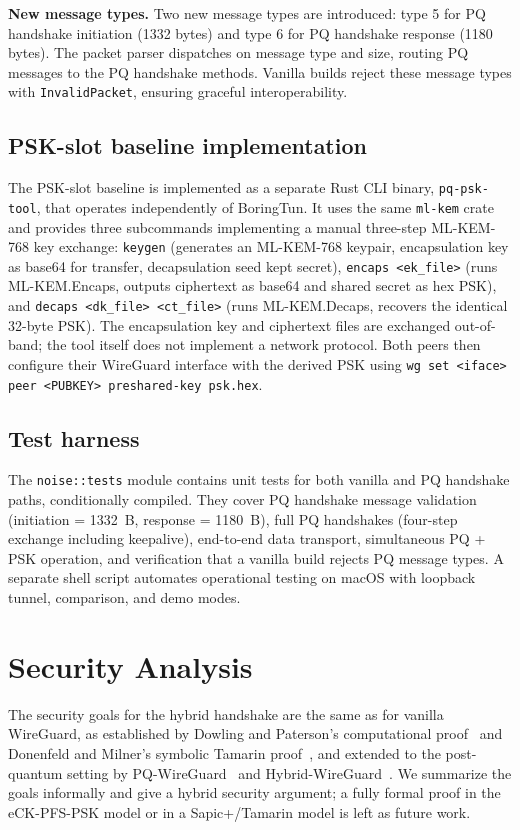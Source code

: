 \documentclass[11pt,a4paper]{article}
\begin{document}
\textbf{New message types.} Two new message types are introduced: type 5 for PQ handshake initiation (1332 bytes) and type 6 for PQ handshake response (1180 bytes). The packet parser dispatches on message type and size, routing PQ messages to the PQ handshake methods. Vanilla builds reject these message types with \texttt{InvalidPacket}, ensuring graceful interoperability.

\subsection{PSK-slot baseline implementation}

The PSK-slot baseline is implemented as a separate Rust CLI binary, \texttt{pq-psk-tool}, that operates independently of BoringTun. It uses the same \texttt{ml-kem} crate and provides three subcommands implementing a manual three-step ML-KEM-768 key exchange: \texttt{keygen} (generates an ML-KEM-768 keypair, encapsulation key as base64 for transfer, decapsulation seed kept secret), \texttt{encaps <ek\_file>} (runs ML-KEM.Encaps, outputs ciphertext as base64 and shared secret as hex PSK), and \texttt{decaps <dk\_file> <ct\_file>} (runs ML-KEM.Decaps, recovers the identical 32-byte PSK). The encapsulation key and ciphertext files are exchanged out-of-band; the tool itself does not implement a network protocol. Both peers then configure their WireGuard interface with the derived PSK using \texttt{wg set <iface> peer <PUBKEY> preshared-key psk.hex}.

\subsection{Test harness}

The \texttt{noise::tests} module contains unit tests for both vanilla and PQ handshake paths, conditionally compiled. They cover PQ handshake message validation (initiation = 1332~B, response = 1180~B), full PQ handshakes (four-step exchange including keepalive), end-to-end data transport, simultaneous PQ + PSK operation, and verification that a vanilla build rejects PQ message types. A separate shell script automates operational testing on macOS with loopback tunnel, comparison, and demo modes.

\section{Security Analysis}
\label{sec:security}

The security goals for the hybrid handshake are the same as for vanilla WireGuard, as established by Dowling and Paterson's computational proof~\cite{dowling2018wireguard} and Donenfeld and Milner's symbolic Tamarin proof~\cite{donenfeld2018formal}, and extended to the post-quantum setting by PQ-WireGuard~\cite{hulsing2021pqwireguard} and Hybrid-WireGuard~\cite{lafourcade2025hybrid}. We summarize the goals informally and give a hybrid security argument; a fully formal proof in the eCK-PFS-PSK model or in a Sapic+/Tamarin model is left as future work.
\end{document}
